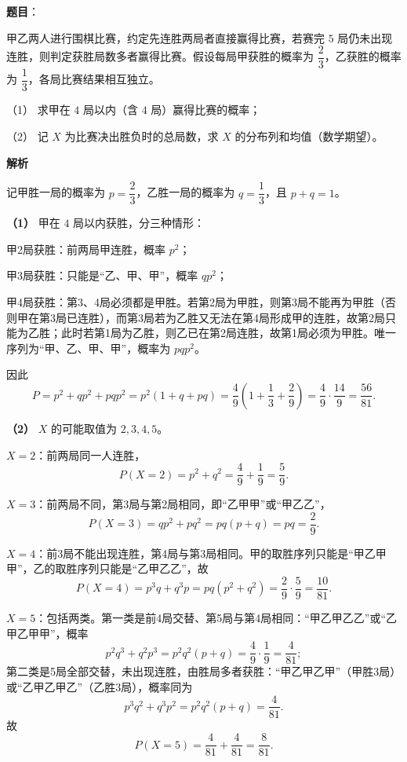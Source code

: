 \begin{answer}

\textbf{题目}：

甲乙两人进行围棋比赛，约定先连胜两局者直接赢得比赛，若赛完 $5$ 局仍未出现连胜，则判定获胜局数多者赢得比赛。假设每局甲获胜的概率为 $\dfrac23$，乙获胜的概率为 $\dfrac13$，各局比赛结果相互独立。

（1） 求甲在 $4$ 局以内（含 $4$ 局）赢得比赛的概率；

（2） 记 $X$ 为比赛决出胜负时的总局数，求 $X$ 的分布列和均值（数学期望）。

\textbf{解析}

记甲胜一局的概率为 $p=\dfrac23$，乙胜一局的概率为 $q=\dfrac13$，且 $p+q=1$。

\textbf{（1）} 甲在 $4$ 局以内获胜，分三种情形：

甲2局获胜：前两局甲连胜，概率 $p^2$；

甲3局获胜：只能是“乙、甲、甲”，概率 $qp^2$；

甲4局获胜：第3、4局必须都是甲胜。若第2局为甲胜，则第3局不能再为甲胜（否则甲在第3局已连胜），而第3局若为乙胜又无法在第4局形成甲的连胜，故第2局只能为乙胜；此时若第1局为乙胜，则乙已在第2局连胜，故第1局必须为甲胜。唯一序列为“甲、乙、甲、甲”，概率为 $pqp^2$。

因此
\nopagebreak[4]
\[P=p^2+qp^2+pqp^2
=p^2(1+q+pq)
=\frac49\left(1+\frac13+\frac29\right)
=\frac49\cdot\frac{14}{9}
=\frac{56}{81} .\]

\textbf{（2）} $X$ 的可能取值为 $2,3,4,5$。

$X=2$：前两局同一人连胜，
\nopagebreak[4]
\[P(X=2)=p^2+q^2=\frac49+\frac19=\frac59 .\]

$X=3$：前两局不同，第3局与第2局相同，即“乙甲甲”或“甲乙乙”，
\nopagebreak[4]
\[P(X=3)=qp^2+pq^2=pq(p+q)=pq=\frac29 .\]

$X=4$：前3局不能出现连胜，第4局与第3局相同。甲的取胜序列只能是“甲乙甲甲”，乙的取胜序列只能是“乙甲乙乙”，故
\nopagebreak[4]
\[P(X=4)=p^3q+q^3p=pq(p^2+q^2)
=\frac29\cdot\frac59=\frac{10}{81} .\]

$X=5$：包括两类。第一类是前4局交替、第5局与第4局相同：“甲乙甲乙乙”或“乙甲乙甲甲”，概率
\nopagebreak[4]
\[p^2q^3+q^2p^3=p^2q^2(p+q)=\frac49\cdot\frac19=\frac4{81};\]
第二类是5局全部交替，未出现连胜，由胜局多者获胜：“甲乙甲乙甲”（甲胜3局）或“乙甲乙甲乙”（乙胜3局），概率同为
\nopagebreak[4]
\[p^3q^2+q^3p^2=p^2q^2(p+q)=\frac4{81}.\]
故
\nopagebreak[4]
\[P(X=5)=\frac4{81}+\frac4{81}=\frac8{81} .\]


\end{answer}
